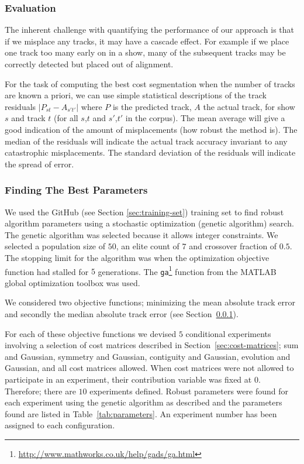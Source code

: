 \documentclass[twocolumn]{article}
\begin{document}
\subsubsection{Evaluation}\label{eval_crit}

The inherent challenge with quantifying the performance of our approach is that if we misplace any tracks, it may have a cascade effect. For example if we place one track too many early on in a show, many of the subsequent tracks may be correctly detected but placed out of alignment. 

For the task of computing the best cost segmentation when the number of tracks are known a priori, we can use simple statistical descriptions of the track residuals $|P_{st}-A_{s't'}|$ where $P$ is the predicted track, $A$ the actual track, for show $s$ and track $t$ (for all $s$,$t$ and $s'$,$t'$ in the corpus). The mean average will give a good indication of the amount of misplacements (how robust the method is). The median of the residuals will indicate the actual track accuracy invariant to any catastrophic misplacements. The standard deviation of the residuals will indicate the spread of error. 

\subsubsection{Finding The Best Parameters}\label{sec:findingbestcostmatrix}

We used the GitHub (see Section \ref{sec:training-set}) training set to find robust algorithm parameters using a stochastic optimization (genetic algorithm) search. The genetic algorithm was selected because it allows integer constraints. We selected a population size of $50$, an elite count of $7$ and crossover fraction of $0.5$. The stopping limit for the algorithm was when the optimization objective function had stalled for $5$ generations. The \texttt{ga}\footnote{\url{http://www.mathworks.co.uk/help/gads/ga.html}} function from the MATLAB global optimization toolbox was used. 

We considered two objective functions; minimizing the mean absolute track error and secondly the median absolute track error (see Section~\ref{eval_crit}).

For each of these objective functions we devised $5$ conditional experiments involving a selection of cost matrices described in Section~\ref{sec:cost-matrices}; sum and Gaussian, symmetry and Gaussian, contiguity and Gaussian, evolution and Gaussian, and all cost matrices allowed. When cost matrices were not allowed to participate in an experiment, their contribution variable was fixed at $0$. Therefore; there are $10$ experiments defined. Robust parameters were found for each experiment using the genetic algorithm as described and the parameters found are listed in Table~\ref{tab:parameters}. An experiment number has been assigned to each configuration.
\end{document}
